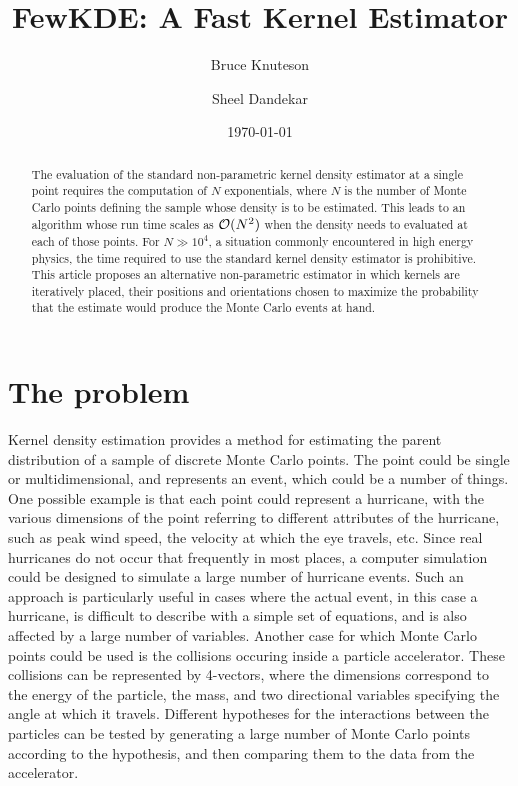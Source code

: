 \documentclass[prd,twocolumn]{revtex4}
\def\FewKDE{{\sc FewKDE}}
\def\nMC{N}
\begin{document}
\title{\FewKDE: A Fast Kernel Estimator}
\author{Bruce Knuteson}
\author{Sheel Dandekar}

\date{\today}

\begin{abstract}
The evaluation of the standard non-parametric kernel density estimator at a single point requires the computation of $\nMC$ exponentials, where $\nMC$ is the number of Monte Carlo points defining the sample whose density is to be estimated.  This leads to an algorithm whose run time scales as ${\cal O}(\nMC^2)$ when the density needs to evaluated at each of those points.  For $\nMC \gg 10^4$, a situation commonly encountered in high energy physics, the time required to use the standard kernel density estimator is prohibitive.  This article proposes an alternative non-parametric estimator in which kernels are iteratively placed, their positions and orientations chosen to maximize the probability that the estimate would produce the Monte Carlo events at hand.
\end{abstract}

\maketitle

\tableofcontents

\section{The problem}

Kernel density estimation provides a method for estimating the parent distribution of a sample of discrete Monte Carlo points.  The point could be single or multidimensional, and represents an event, which could be a number of things.  One possible example is that each point could represent a hurricane, with the various dimensions of the point referring to different attributes of the hurricane, such as peak wind speed, the velocity at which the eye travels, etc.  Since real hurricanes do not occur that frequently in most places, a computer simulation could be designed to simulate a large number of hurricane events.  Such an approach is particularly useful in cases where the actual event, in this case a hurricane, is difficult to describe with a simple set of equations, and is also affected by a large number of variables.  Another case for which Monte Carlo points could be used is the collisions occuring inside a particle accelerator.  These collisions can be represented by 4-vectors, where the dimensions correspond to the energy of the particle, the mass, and two directional variables specifying the angle at which it travels.  Different hypotheses for the interactions between the particles can be tested by generating a large number of Monte Carlo points according to the hypothesis, and then comparing them to the data from the accelerator.
\end{document}
